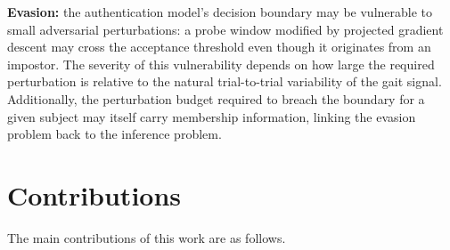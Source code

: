 \textbf{Evasion:} the authentication model's decision boundary may be vulnerable to small adversarial perturbations: a probe window modified by projected gradient descent may cross the acceptance threshold even though it originates from an impostor. The severity of this vulnerability depends on how large the required perturbation is relative to the natural trial-to-trial variability of the gait signal. Additionally, the perturbation budget required to breach the boundary for a given subject may itself carry membership information, linking the evasion problem back to the inference problem.

\section{Contributions}
\label{sec:intro_contributions}

The main contributions of this work are as follows.

